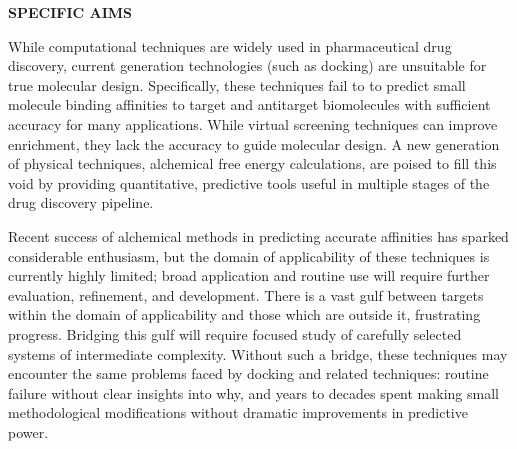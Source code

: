 \documentclass[11pt]{article}
\begin{document}





\noindent \begin{center}
{\bf SPECIFIC AIMS}
\end{center}

While computational techniques are widely used in pharmaceutical drug discovery, current generation technologies (such as docking) are unsuitable for true molecular design. 
Specifically, these techniques fail to to predict small molecule binding affinities to target and antitarget biomolecules with sufficient accuracy for many applications. 
While virtual screening techniques can improve enrichment, they lack the accuracy to guide molecular design. 
A new generation of physical techniques, alchemical free energy calculations, are poised to fill this void by providing quantitative, predictive tools useful in multiple stages of the drug discovery pipeline.

Recent success of alchemical methods in predicting accurate affinities has sparked considerable enthusiasm, but the domain of applicability of these techniques is currently highly limited; broad application and routine use will require further evaluation, refinement, and development. 
There is a vast gulf between targets within the domain of applicability and those which are outside it, frustrating progress. 
Bridging this gulf will require focused study of carefully selected systems of intermediate complexity. 
Without such a bridge, these techniques may encounter the same problems faced by docking and related techniques: routine failure without clear insights into why, and years to decades spent making small methodological modifications without dramatic improvements in predictive power.
\end{document}
